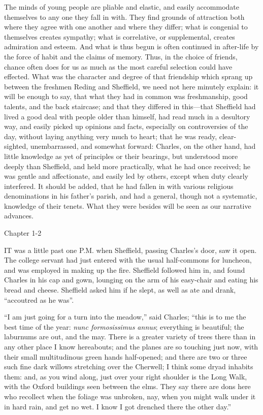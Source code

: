 The minds of young people are pliable and elastic, and easily
accommodate themselves to any one they fall in with. They find grounds
of attraction both where they agree with one another and where they
differ; what is congenial to themselves creates sympathy; what is
correlative, or supplemental, creates admiration and esteem. And what
is thus begun is often continued in after-life by the force of habit
and the claims of memory. Thus, in the choice of friends, chance often
does for us as much as the most careful selection could have effected.
What was the character and degree of that friendship which sprang up
between the freshmen Reding and Sheffield, we need not here minutely
explain: it will be enough to say, that what they had in common was
freshmanship, good talents, and the back staircase; and that they
differed in this—that Sheffield had lived a good deal with people
older than himself, had read much in a desultory way, and easily
picked up opinions and facts, especially on controversies of the day,
without laying anything very much to heart; that he was ready,
clear-sighted, unembarrassed, and somewhat forward: Charles, on the
other hand, had little knowledge as yet of principles or their
bearings, but understood more deeply than Sheffield, and held more
practically, what he had once received; he was gentle and
affectionate, and easily led by others, except when duty clearly
interfered. It should be added, that he had fallen in with various
religious denominations in his father's parish, and had a general,
though not a systematic, knowledge of their tenets. What they were
besides will be seen as our narrative advances.

Chapter 1-2


IT was a little past one P.M.
when Sheffield, passing Charles's door, saw it open. The college
servant had just entered with the usual half-commons for luncheon, and
was employed in making up the fire. Sheffield followed him in, and
found Charles in his cap and gown, lounging on the arm of his
easy-chair and eating his bread and cheese. Sheffield asked him if he
slept, as well as ate and drank, ``accoutred as he was''.

``I am just going for a turn into the meadow,'' said
Charles; ``this is to me the best time of the year: \emph{nunc
formosissimus annus}; everything is beautiful; the laburnums are
out, and the may. There is a greater variety of trees there than in
any other place I know hereabouts; and the planes are so touching just
now, with their small multitudinous green hands half-opened; and there
are two or three such fine dark willows stretching over the Cherwell;
I think some dryad inhabits them: and, as you wind along, just over
your right shoulder is the Long Walk, with the Oxford buildings seen
between the elms. They say there are dons here who recollect when the
foliage was unbroken, nay, when you might walk under it in hard rain, and get no wet. I know I got drenched there the other day.''

